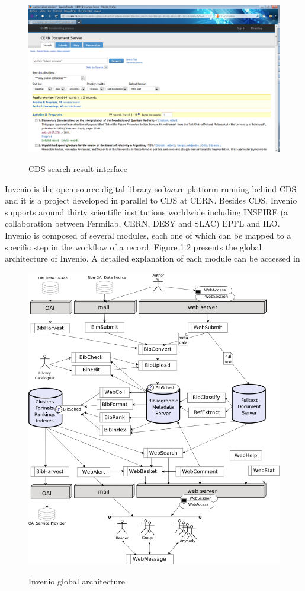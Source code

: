 \begin{figure}
\centering
\includegraphics[height=7 cm]{figures/cds_screenshot.png}
\label{cds_screenshot}
\caption{CDS search result interface}
\end{figure}
 


Invenio\cite{invenio} is the open-source digital library software platform running behind CDS and it is a project developed in parallel to CDS at CERN. Besides CDS, Invenio supports around thirty scientific institutions worldwide including INSPIRE (a collaboration between Fermilab, CERN, DESY and SLAC) EPFL and ILO.
Invenio is composed of several modules, each one of which can be mapped to a specific step in the workflow of a record. Figure 1.2 presents the global architecture of Invenio. A detailed explanation of each module can be accessed in \cite{invenio_modules} 

\begin{figure}
\centering
\includegraphics[height=15 cm]{figures/invenio.jpeg}
\label{invenio_architecture}
\caption{Invenio global architecture}
\end{figure}


